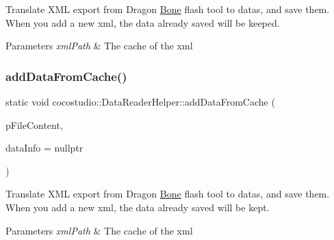 Translate X\+ML export from Dragon \hyperlink{classcocostudio_1_1Bone}{Bone} flash tool to datas, and save them. When you add a new xml, the data already saved will be keeped.


\begin{DoxyParams}{Parameters}
{\em xml\+Path} & The cache of the xml \\
\hline
\end{DoxyParams}
\mbox{\label{classcocostudio_1_1DataReaderHelper_a232ea5d6542dee745c9e9b711c8f5c80}} 
\subsubsection{\texorpdfstring{add\+Data\+From\+Cache()}{addDataFromCache()}\hspace{0.1cm}{\footnotesize\ttfamily [2/2]}}
{\footnotesize\ttfamily static void cocostudio\+::\+Data\+Reader\+Helper\+::add\+Data\+From\+Cache (\begin{DoxyParamCaption}\item[{const std\+::string \&}]{p\+File\+Content,  }\item[{\hyperlink{structcocostudio_1_1DataReaderHelper_1_1__DataInfo}{Data\+Info} $\ast$}]{data\+Info = {\ttfamily nullptr} }\end{DoxyParamCaption})\hspace{0.3cm}{\ttfamily [static]}}

Translate X\+ML export from Dragon \hyperlink{classcocostudio_1_1Bone}{Bone} flash tool to datas, and save them. When you add a new xml, the data already saved will be kept.


\begin{DoxyParams}{Parameters}
{\em xml\+Path} & The cache of the xml \\
\hline
\end{DoxyParams}
\mbox{\label{classcocostudio_1_1DataReaderHelper_a95b8fde8e5e84e698dae3b938b0d414f}} 
